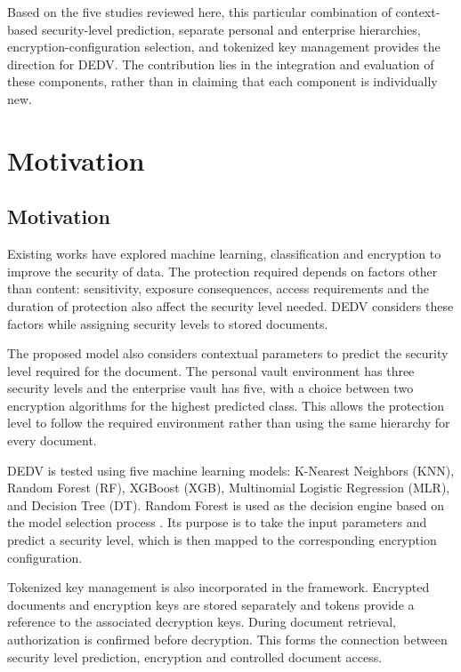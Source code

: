 \documentclass[pdflatex,sn-mathphys-num]{sn-jnl}
\begin{document}
Based on the five studies reviewed here, this particular combination of context-based
security-level prediction, separate personal and enterprise hierarchies, encryption-configuration
selection, and tokenized key management provides the direction for DEDV. The contribution lies in
the integration and evaluation of these components, rather than in claiming that each component is
individually new.

\section{Motivation}\label{sec3}

\subsection{Motivation}

Existing works have explored machine learning, classification and encryption to improve the
security of data. The protection required depends on factors other than content: sensitivity,
exposure consequences, access requirements and the duration of protection also affect the
security level needed. DEDV considers these factors while assigning security levels to stored
documents.

The proposed model also considers contextual parameters to predict the security level required
for the document. The personal vault environment has three security levels and the enterprise
vault has five, with a choice between two encryption algorithms for the highest predicted class.
This allows the protection level to follow the required environment rather than using the same
hierarchy for every document.

DEDV is tested using five machine learning models: K-Nearest Neighbors (KNN), Random Forest (RF),
XGBoost (XGB), Multinomial Logistic Regression (MLR), and Decision Tree (DT). Random Forest is used
as the decision engine based on the model selection process \cite{speiser2019comparison}. Its
purpose is to take the input parameters and predict a security level, which is then mapped to the
corresponding encryption configuration.

Tokenized key management is also incorporated in the framework. Encrypted documents and encryption
keys are stored separately and tokens provide a reference to the associated decryption keys.
During document retrieval, authorization is confirmed before decryption. This forms the connection
between security level prediction, encryption and controlled document access.
\end{document}

